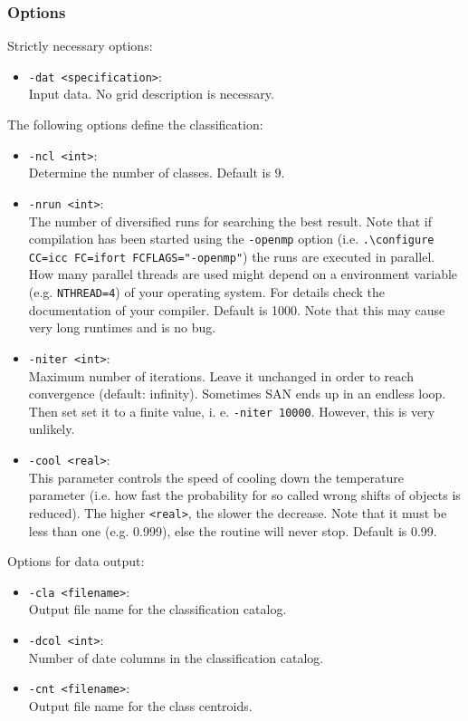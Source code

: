 \documentclass[12pt, oneside, a4paper, headsepline, plainheadsepline]{scrbook}
\begin{document}
\subsubsection*{Options}
Strictly necessary options:
\begin{itemize}
 \item \verb+-dat <specification>+:\\ Input data. No grid description is necessary.
\end{itemize}
The following options define the classification:
\begin{itemize}
 \item \verb+-ncl <int>+:\\ 
 Determine the number of classes. Default is 9. 
 \item \verb+-nrun <int>+:\\ 	
 The number of diversified runs for searching the best result.
 Note that if compilation has been started using the \verb+-openmp+ option 
 (i.e. \verb+.\configure CC=icc FC=ifort FCFLAGS="-openmp"+) the runs are executed in parallel.
 How many parallel threads are used might depend on a environment variable (e.g. \verb+NTHREAD=4+)
 of your operating system. For details check the documentation of your compiler. Default is 1000. Note that this may cause very long runtimes and is no bug.
 \item \verb+-niter <int>+:\\ Maximum number of iterations. Leave it unchanged in order to reach convergence (default: infinity). Sometimes SAN ends up in an endless loop. Then set set it to a finite value, i. e. \verb+-niter 10000+. However, this is very unlikely.
\item \verb+-cool <real>+:\\
This parameter controls the speed of cooling down the temperature parameter (i.e. how fast
the probability for so called wrong shifts of objects is reduced). The higher \verb+<real>+, the slower the decrease. Note that it must be less than one (e.g. 0.999), else the routine will never stop. Default is 0.99.
\end{itemize}
Options for data output:
\begin{itemize}
 \item \verb+-cla <filename>+:\\ Output file name for the classification catalog.
 \item \verb+-dcol <int>+:\\ Number of date columns in the classification catalog.
 \item \verb+-cnt <filename>+:\\ Output file name for the class centroids.
\end{itemize}
\end{document}
